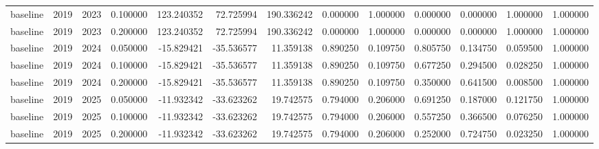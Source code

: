 \begin{tabular}{lrrrrrrrrrrrr}
baseline & 2019 & 2023 & 0.100000 & 123.240352 & 72.725994 & 190.336242 & 0.000000 & 1.000000 & 0.000000 & 0.000000 & 1.000000 & 1.000000 \\
baseline & 2019 & 2023 & 0.200000 & 123.240352 & 72.725994 & 190.336242 & 0.000000 & 1.000000 & 0.000000 & 0.000000 & 1.000000 & 1.000000 \\
baseline & 2019 & 2024 & 0.050000 & -15.829421 & -35.536577 & 11.359138 & 0.890250 & 0.109750 & 0.805750 & 0.134750 & 0.059500 & 1.000000 \\
baseline & 2019 & 2024 & 0.100000 & -15.829421 & -35.536577 & 11.359138 & 0.890250 & 0.109750 & 0.677250 & 0.294500 & 0.028250 & 1.000000 \\
baseline & 2019 & 2024 & 0.200000 & -15.829421 & -35.536577 & 11.359138 & 0.890250 & 0.109750 & 0.350000 & 0.641500 & 0.008500 & 1.000000 \\
baseline & 2019 & 2025 & 0.050000 & -11.932342 & -33.623262 & 19.742575 & 0.794000 & 0.206000 & 0.691250 & 0.187000 & 0.121750 & 1.000000 \\
baseline & 2019 & 2025 & 0.100000 & -11.932342 & -33.623262 & 19.742575 & 0.794000 & 0.206000 & 0.557250 & 0.366500 & 0.076250 & 1.000000 \\
baseline & 2019 & 2025 & 0.200000 & -11.932342 & -33.623262 & 19.742575 & 0.794000 & 0.206000 & 0.252000 & 0.724750 & 0.023250 & 1.000000 \\
\bottomrule
\end{tabular}
